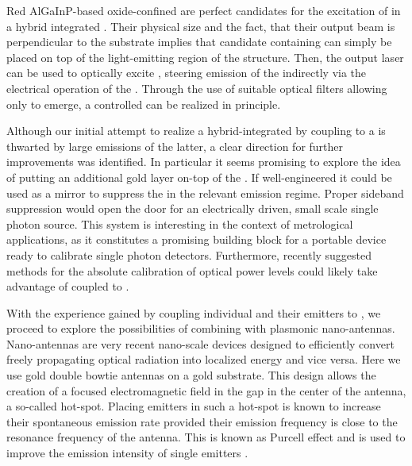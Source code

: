 
   Red AlGaInP-based oxide-confined \VCSELs are perfect candidates for the excitation of \sivs in a hybrid integrated \sps. Their physical size and the fact, that their output beam is perpendicular to the substrate implies that candidate \nds containing \sivs can simply be placed on top of the light-emitting region of the structure. Then, the \VCSELs output laser can be used to optically excite \sivs, steering emission of the \siv indirectly via the electrical operation of the \VCSEL. Through the use of suitable optical filters allowing only \siv \fl to emerge, a controlled \sps can be realized in principle.

   Although our initial attempt to realize a hybrid-integrated \sps by coupling \sivs to a \VCSEL is thwarted by large \sb emissions of the latter, a clear direction for further improvements was identified. In particular it seems promising to explore the idea of putting an additional gold layer on-top of the \VCSEL. If well-engineered it could be used as a mirror to suppress the \VCSEL \sb in the relevant \siv emission regime. Proper sideband suppression would open the door for an electrically driven, small scale single photon source. This system is interesting in the context of metrological applications, as it constitutes a promising building block for a portable device ready to calibrate single photon detectors. Furthermore, recently suggested methods for the absolute calibration of optical power levels could likely take advantage of \sivs coupled to \VCSELs \cite{Vaigu2017}.


   With the experience gained by coupling individual \nds and their emitters to \VCSELs, we proceed to explore the possibilities of combining \sivs with plasmonic nano-antennas. Nano-antennas are very recent nano-scale devices designed to efficiently convert freely propagating optical radiation into localized energy and vice versa. Here we use gold double bowtie antennas on a gold substrate. This design allows the creation of a focused electromagnetic field in the gap in the center of the antenna, a so-called hot-spot. Placing emitters in such a hot-spot is known to increase their spontaneous emission rate provided their emission frequency is close to the resonance frequency of the antenna. This is known as Purcell effect and is used to improve the emission intensity of single emitters \cite{purcell1995spontaneous}.

